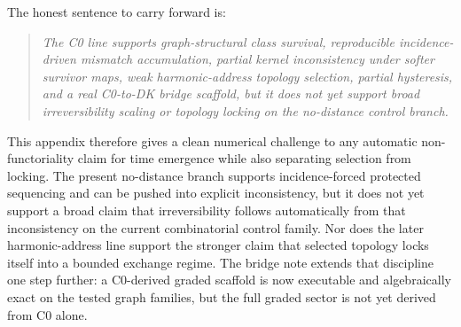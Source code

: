 The honest sentence to carry forward is:
\begin{quote}
\emph{The C0 line supports graph-structural class survival, reproducible incidence-driven mismatch accumulation, partial kernel inconsistency under softer survivor maps, weak harmonic-address topology selection, partial hysteresis, and a real C0-to-DK bridge scaffold, but it does not yet support broad irreversibility scaling or topology locking on the no-distance control branch.}
\end{quote}

This appendix therefore gives a clean numerical challenge to any automatic non-functoriality claim for time emergence while also separating selection from locking. The present no-distance branch supports incidence-forced protected sequencing and can be pushed into explicit inconsistency, but it does not yet support a broad claim that irreversibility follows automatically from that inconsistency on the current combinatorial control family. Nor does the later harmonic-address line support the stronger claim that selected topology locks itself into a bounded exchange regime. The bridge note extends that discipline one step further: a C0-derived graded scaffold is now executable and algebraically exact on the tested graph families, but the full graded sector is not yet derived from C0 alone.
